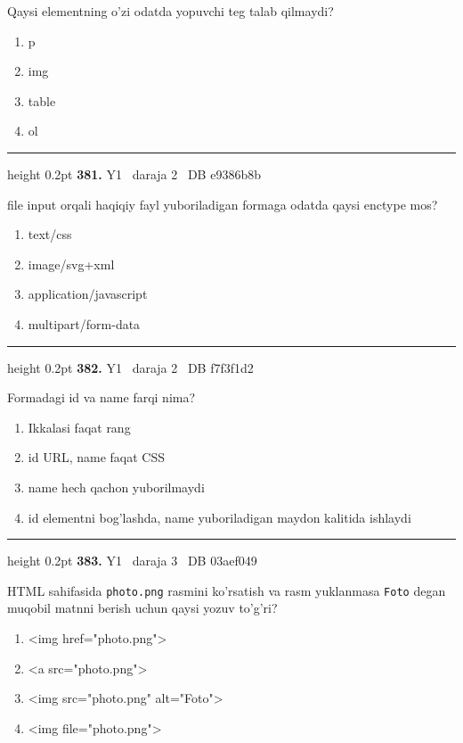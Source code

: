 \documentclass[10pt,a4paper,oneside]{article}
\begin{document}
\par
Qaysi elementning o'zi odatda yopuvchi teg talab qilmaydi?
\begin{enumerate}[label=\Alph*),leftmargin=9mm]
\item p
\item img
\item table
\item ol
\end{enumerate}
\vspace{2mm}\hrule height 0.2pt \vspace{4mm}
\hypertarget{q381}{\textbf{\color{ink}381.}}  {\color{muted}\scriptsize Y1 \textbullet\ daraja 2 \textbullet\ DB e9386b8b}
\par
file input orqali haqiqiy fayl yuboriladigan formaga odatda qaysi enctype mos?
\begin{enumerate}[label=\Alph*),leftmargin=9mm]
\item text/css
\item image/svg+xml
\item application/javascript
\item multipart/form-data
\end{enumerate}
\vspace{2mm}\hrule height 0.2pt \vspace{4mm}
\hypertarget{q382}{\textbf{\color{ink}382.}}  {\color{muted}\scriptsize Y1 \textbullet\ daraja 2 \textbullet\ DB f7f3f1d2}
\par
Formadagi id va name farqi nima?
\begin{enumerate}[label=\Alph*),leftmargin=9mm]
\item Ikkalasi faqat rang
\item id URL, name faqat CSS
\item name hech qachon yuborilmaydi
\item id elementni bog'lashda, name yuboriladigan maydon kalitida ishlaydi
\end{enumerate}
\vspace{2mm}\hrule height 0.2pt \vspace{4mm}
\hypertarget{q383}{\textbf{\color{ink}383.}}  {\color{muted}\scriptsize Y1 \textbullet\ daraja 3 \textbullet\ DB 03aef049}
\par
HTML sahifasida \texttt{photo.png} rasmini ko'rsatish va rasm yuklanmasa \texttt{Foto} degan muqobil matnni berish uchun qaysi yozuv to'g'ri?
\begin{enumerate}[label=\Alph*),leftmargin=9mm]
\item \textless{}img href="photo.png"\textgreater{}
\item \textless{}a src="photo.png"\textgreater{}
\item \textless{}img src="photo.png" alt="Foto"\textgreater{}
\item \textless{}img file="photo.png"\textgreater{}
\end{enumerate}
\end{document}
